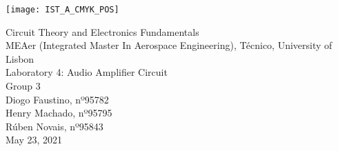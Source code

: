 
\thispagestyle {empty}

\texttt{[image: IST\_A\_CMYK\_POS]}

\begin{center}
%
\vspace{1.0cm}

\vspace{1cm}
{\FontLb Circuit Theory and Electronics Fundamentals} \\ %
\vspace{1cm}
{\FontSn MEAer (Integrated Master In Aerospace Engineering), Técnico, University of Lisbon} \\ %
\vspace{1cm}
{\FontSn Laboratory 4: Audio Amplifier Circuit} \\
\vspace{1cm}
{\FontSn Group 3} \\
\vspace{0.7cm}
{\FontSn Diogo Faustino, nº95782} \\
\vspace{0.4mm}
{\FontSn Henry Machado, nº95795} \\
\vspace{0.4mm}
{\FontSn Rúben Novais, nº95843} \\
\vspace{1cm}
{\FontSn May 23, 2021} \\ %
%
\end{center}

